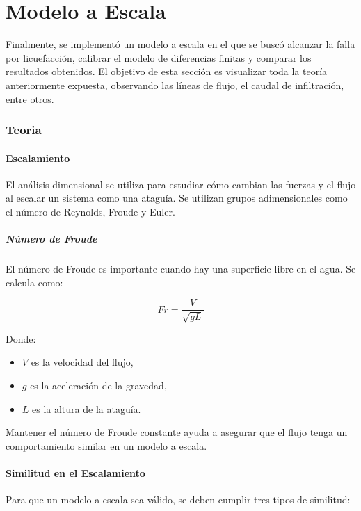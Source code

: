 \part{Modelo a Escala}

Finalmente, se implementó un modelo a escala en el que se buscó alcanzar la falla por licuefacción, calibrar el modelo de diferencias finitas y comparar los resultados obtenidos. El objetivo de esta sección es visualizar toda la teoría anteriormente expuesta, observando las líneas de flujo, el caudal de infiltración, entre otros.

\section{Teoria}

\subsection{Escalamiento}
El análisis dimensional se utiliza para estudiar cómo cambian las fuerzas y el flujo al escalar un sistema como una ataguía. Se utilizan grupos adimensionales como el número de Reynolds, Froude y Euler.

\subsubsection{Número de Froude}
El número de Froude es importante cuando hay una superficie libre en el agua. Se calcula como:

\begin{equation}
Fr = \frac{V}{\sqrt{g L}}
\end{equation}

Donde:
\begin{itemize}
    \item $V$ es la velocidad del flujo,
    \item $g$ es la aceleración de la gravedad,
    \item $L$ es la altura de la ataguía.
\end{itemize}

Mantener el número de Froude constante ayuda a asegurar que el flujo tenga un comportamiento similar en un modelo a escala.


\subsection{Similitud en el Escalamiento}
Para que un modelo a escala sea válido, se deben cumplir tres tipos de similitud:

